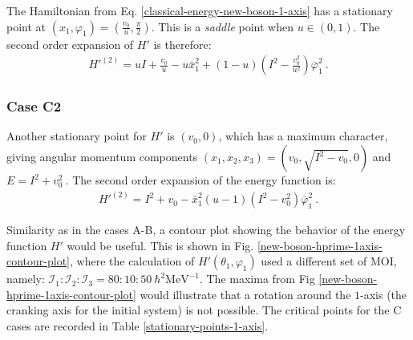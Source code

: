 The Hamiltonian from Eq. \ref{classical-energy-new-boson-1-axis} has a stationary point at $(x_1,\varphi_1)=\left(\frac{v_0}{u},\frac{\pi}{2}\right)$. This is a \emph{saddle} point when $u\in(0,1)$. The second order expansion of $H'$ is therefore:
\begin{align}
    H'^{(2)}=uI+\frac{v_0}{u}-u\bar{x}_1^2+(1-u)\left(I^2-\frac{v_0^2}{u^2}\right)\bar{\varphi}_1^2\ .
\end{align}

\subsubsection*{Case C2}

Another stationary point for $H'$ is $(v_0,0)$, which has a maximum character, giving angular momentum components $(x_1,x_2,x_3)=(v_0,\sqrt{I^2-v_0},0)$ and $E=I^2+v_0^2\ .$ The second order expansion of the energy function is:
\begin{align}
    H'^{(2)}=I^2+v_0-\bar{x}_1^2(u-1)\left(I^2-v_0^2\right)\bar{\varphi}_1^2\ .
\end{align}

Similarity as in the cases A-B, a contour plot showing the behavior of the energy function $H'$ would be useful. This is shown in Fig. \ref{new-boson-hprime-1axis-contour-plot}, where the calculation of $H'(\theta_1,\varphi_1)$ used a different set of MOI, namely: $\mathcal{I}_1:\mathcal{I}_2:\mathcal{I}_3=80:10:50\ \hbar^2\text{MeV}^{-1}$. The maxima from Fig \ref{new-boson-hprime-1axis-contour-plot} would illustrate that a rotation around the $1$-axis (the cranking axis for the initial system) is not possible. The critical points for the C cases are recorded in Table \ref{stationary-points-1-axis}.
\begin{table}
    \centering
    \caption{The stationary points for the classical energy function depicted in Eq. \ref{new-boson-h-prime-classical}, when the quantization axis is the $1$-axis. Each point corresponds to the cases $C1$, $C2$, respectively.}
    \label{stationary-points-1-axis}
\end{table}

